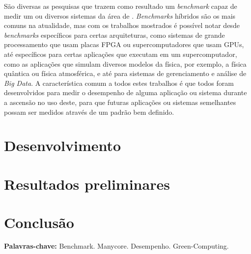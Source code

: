 \begin{resumo}
São diversas as pesquisas que trazem como resultado um \textit{benchmark} capaz de medir um ou diversos sistemas da área de \HPC. \textit{Benchmarks} híbridos são os mais comuns na atualidade, mas com os trabalhos mostrados é possível notar desde \textit{benchmarks} específicos para certas arquiteturas, como sistemas de grande processamento que usam placas FPGA ou supercomputadores que usam GPUs, até específicos para certas aplicações que executam em um supercomputador, como as aplicações que simulam diversos modelos da física, por exemplo, a física quântica ou física atmosférica, e até para sistemas de gerenciamento e análise de \textit{Big Data}. A característica comum a todos estes trabalhos é que todos foram desenvolvidos para medir o desempenho de alguma aplicação ou sistema durante a ascensão no uso deste, para que futuras aplicações ou sistemas semelhantes possam ser medidos através de um padrão bem definido.

\section*{Desenvolvimento} 

\section*{Resultados preliminares} 

\section*{Conclusão}

\vspace{\baselineskip}  %
\textbf{Palavras-chave:} Benchmark. Manycore. Desempenho. Green-Computing.
\end{resumo}


